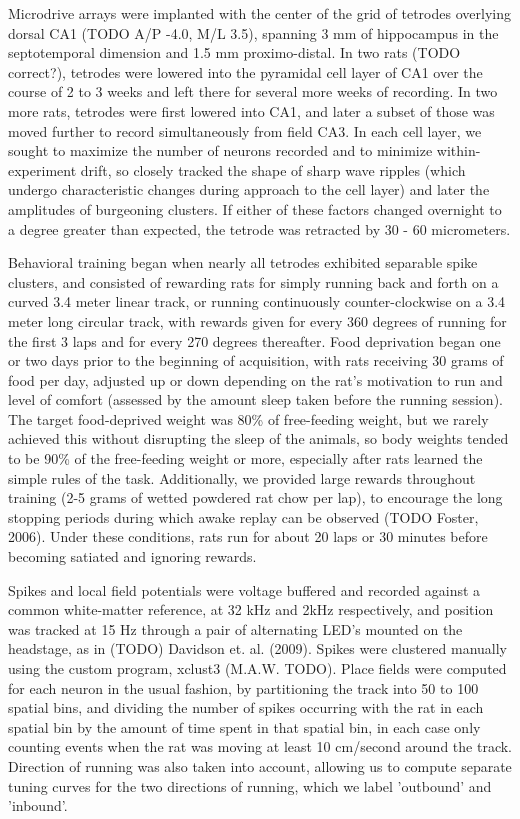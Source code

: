 \documentclass[10pt]{article}
\begin{document}
Microdrive arrays were implanted with the center of the grid of tetrodes overlying dorsal CA1 (TODO A/P -4.0, M/L 3.5), spanning 3 mm of hippocampus in the septotemporal dimension and 1.5 mm proximo-distal. In two rats (TODO correct?), tetrodes were lowered into the pyramidal cell layer of CA1 over the course of 2 to 3 weeks and left there for several more weeks of recording.  In two more rats, tetrodes were first lowered into CA1, and later a subset of those was moved further to record simultaneously from field CA3. In each cell layer, we sought to maximize the number of neurons recorded and to minimize within-experiment drift, so closely tracked the shape of sharp wave ripples (which undergo characteristic changes during approach to the cell layer) and later the amplitudes of burgeoning clusters. If either of these factors changed overnight to a degree greater than expected, the tetrode was retracted by 30 - 60 micrometers.

Behavioral training began when nearly all tetrodes exhibited separable spike clusters, and consisted of rewarding rats for simply running back and forth on a curved 3.4 meter linear track, or running continuously counter-clockwise on a 3.4 meter long circular track, with rewards given for every 360 degrees of running for the first 3 laps and for every 270 degrees thereafter. Food deprivation began one or two days prior to the beginning of acquisition, with rats receiving 30 grams of food per day, adjusted up or down depending on the rat's motivation to run and level of comfort (assessed by the amount sleep taken before the running session). The target food-deprived weight was 80\% of free-feeding weight, but we rarely achieved this without disrupting the sleep of the animals, so body weights tended to be 90\% of the free-feeding weight or more, especially after rats learned the simple rules of the task. Additionally, we provided large rewards throughout training (2-5 grams of wetted powdered rat chow per lap), to encourage the long stopping periods during which awake replay can be observed (TODO Foster, 2006). Under these conditions, rats run for about 20 laps or 30 minutes before becoming satiated and ignoring rewards.

Spikes and local field potentials were voltage buffered and recorded against a common white-matter reference, at 32 kHz and 2kHz respectively, and position was tracked at 15 Hz through a pair of alternating LED's mounted on the headstage, as in (TODO) Davidson et. al. (2009). Spikes were clustered manually using the custom program, xclust3 (M.A.W. TODO). Place fields were computed for each neuron in the usual fashion, by partitioning the track into 50 to 100 spatial bins, and dividing the number of spikes occurring with the rat in each spatial bin by the amount of time spent in that spatial bin, in each case only counting events when the rat was moving at least 10 cm/second around the track. Direction of running was also taken into account, allowing us to compute separate tuning curves for the two directions of running, which we label 'outbound' and 'inbound'.
\end{document}
